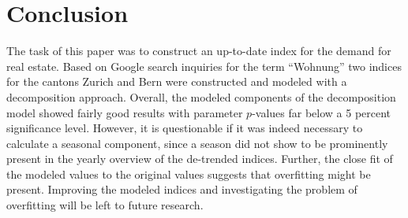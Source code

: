 \documentclass[11pt]{article}
\begin{document}
\section*{Conclusion}
The task of this paper was to construct an up-to-date index for the demand for real estate. Based on Google search inquiries for the term ``Wohnung'' two indices for the cantons Zurich and Bern were constructed and modeled with a decomposition approach.
Overall, the modeled components of the decomposition model showed fairly good results with parameter \(p\)-values far below a 5 percent significance level. However, it is questionable if it was indeed necessary to calculate a seasonal component, since a season did not show to be prominently present in the yearly overview of the de-trended indices. Further, the close fit of the modeled values to the original values suggests that overfitting might be present. Improving the modeled indices and investigating the problem of overfitting will be left to future research.

\newpage
\clearpage
\singlespacing

\end{document}
